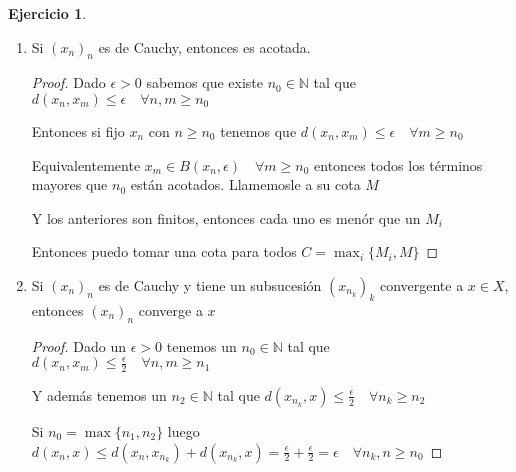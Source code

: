 \documentclass[11pt]{report}
\newcommand{\Q}{\mathbb{Q}}
\newcommand{\N}{\mathbb{N}}
\newcommand{\Ra}{\Rightarrow}
\theoremstyle{definition}
\newtheorem{ej}{Ejercicio}
\begin{document}
\begin{ej}
\begin{enumerate}
		\begin{proof}
			$\Ra )$ Sea $x_n$ convergente a $x$ 

			Tomemos $\epsilon > 0$ sabemos que existe $n_0 \in \N$ tal que $d(x_n,x) < \frac{\epsilon}{2} \quad \forall n \geq n_0$

			Ahora si miramos $d(x_n,x_j) \leq d(x_n,x) + d(x,x_j) \leq \frac{\epsilon}{2} + \frac{\epsilon}{2} = \epsilon \quad \forall n,j \geq n_0$

			La vuelta no vale cuando no es completo. Por ejemplo los racionales, tenemos la sucesion $x_n = \sqrt{2} + \frac{1}{n}$ es facil ver que es de Cauchy, sin embargo no converge en $\Q$ por que $\sqrt{2}$ no está en $\Q$
		\end{proof}
		
	\item Si $(x_n)_n$ es de Cauchy, entonces es acotada.

		\begin{proof}
		Dado $\epsilon > 0$ sabemos que existe $n_0 \in \N$ tal que $d(x_n,x_m) \leq \epsilon \quad \forall n,m \geq n_0$

		Entonces si fijo $x_n$ con $n \geq n_0$ tenemos que $d(x_n,x_m) \leq \epsilon \quad \forall m \geq n_0$

		Equivalentemente $x_m \in B(x_n,\epsilon) \quad \forall m \geq n_0$ entonces todos los términos mayores que $n_0$ están acotados. Llamemosle a su cota $M$

		Y los anteriores son finitos, entonces cada uno es menór que un $M_i$

		Entonces puedo tomar una cota para todos $C = \max_{i}\{M_i,M\}$
		\end{proof}
	\item Si $(x_n)_n$ es de Cauchy y tiene un subsucesión $(x_{n_k})_k$ convergente a $x \in X$, entonces $(x_n)_n$ converge a $x$
		\begin{proof}
			Dado un $\epsilon >0$ tenemos un $n_0 \in \N$ tal que $d(x_n,x_m) \leq \frac{\epsilon}{2} \quad \forall n,m \geq n_1$

			Y además tenemos un $n_2 \in \N$ tal que $d(x_{n_k},x) \leq \frac{\epsilon}{2} \quad \forall n_k \geq n_2$

			Si $n_0 = \max\{n_1,n_2\}$ luego $d(x_n ,x )\leq d(x_n,x_{n_k}) + d(x_{n_k},x) = \frac{\epsilon}{2} + \frac{\epsilon}{2} = \epsilon \quad \forall n_k,n \geq n_0$
		\end{proof}
	\end{enumerate}
\end{ej}
\end{document}
